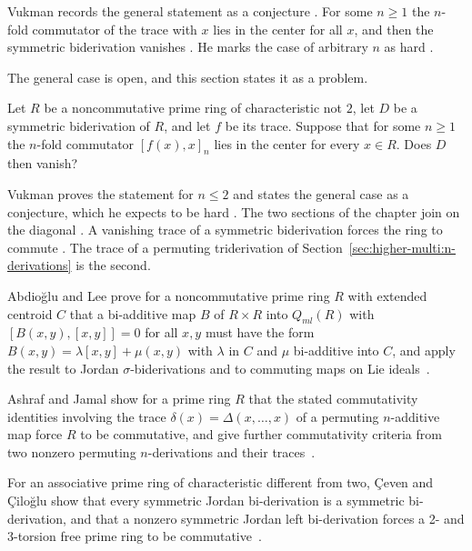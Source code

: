 Vukman records the general statement as a conjecture
\cite[pp.~188--189]{Vukman1990Two}. For some $n\geq 1$ the $n$-fold
commutator of the trace with $x$ lies in the center for all $x$, and then
the symmetric biderivation vanishes \cite[pp.~188--189]{Vukman1990Two}. He
marks the case of arbitrary $n$ as hard \cite[p.~189]{Vukman1990Two}.

The general case is open, and this section states it as a problem. %

\begin{problem}\label{prob:open:vukman}
Let $R$ be a noncommutative prime ring of characteristic not $2$, let $D$ be a
symmetric biderivation of $R$, and let $f$ be its trace.
Suppose that for some $n\ge1$ the $n$-fold commutator $[f(x),x]_n$ lies in the
center for every $x\in R$.
Does $D$ then vanish?
\end{problem}

Vukman proves the statement for $n\le2$ \cite[Theorem~2, p.~187]{Vukman1990Two}
and states the general case as a conjecture, which he expects to be hard
\cite[pp.~188--189]{Vukman1990Two}. The two sections of the chapter join on the
diagonal \cite[p.~490]{Yazarli2017Trideriv}. A vanishing trace of a symmetric
biderivation forces the ring to commute
\cite[p.~187]{Vukman1990Two}. The trace of a permuting
triderivation of Section~\ref{sec:higher-multi:n-derivations} is the
second.

Abdio\u{g}lu and Lee prove for a noncommutative prime ring $R$ with extended centroid $C$ that a bi-additive map $B$ of $R\times R$ into $Q_{ml}(R)$ with $[B(x,y),[x,y]]=0$ for all $x,y$ must have the form $B(x,y)=\lambda[x,y]+\mu(x,y)$ with $\lambda$ in $C$ and $\mu$ bi-additive into $C$, and apply the result to Jordan $\sigma$-biderivations and to commuting maps on Lie ideals~\cite{WlABasicFunctionalIdentityWithAp2017}.

Ashraf and Jamal show for a prime ring $R$ that the stated commutativity identities involving the trace $\delta(x)=\Delta(x,\dots,x)$ of a permuting $n$-additive map force $R$ to be commutative, and give further commutativity criteria from two nonzero permuting $n$-derivations and their traces~\cite{WlTracesOfPermutingNAdditiveMaps2014}.

For an associative prime ring of characteristic different from two, \c{C}even and \c{C}ilo\u{g}lu show that every symmetric Jordan bi-derivation is a symmetric bi-derivation, and that a nonzero symmetric Jordan left bi-derivation forces a 2- and 3-torsion free prime ring to be commutative~\cite{WlOnSymmetricJordanAndJordanLeft2018}.


